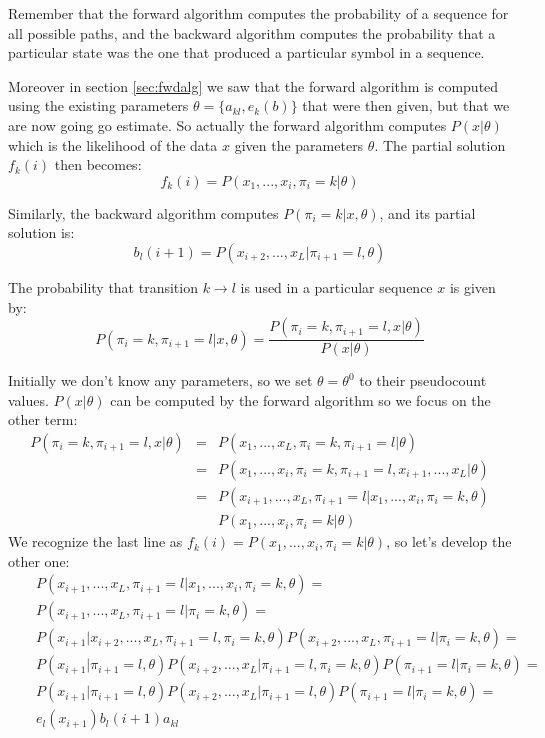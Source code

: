 Remember that the forward algorithm computes the probability of a sequence for all possible paths, and the backward algorithm computes the probability that a particular state was the one that produced a particular symbol in a sequence.

Moreover in section \ref{sec:fwdalg} we saw that the forward algorithm is computed using the existing parameters $\theta = \{ a_{kl}, e_k(b) \}$ that were then given, but that we are now going go estimate. So actually the forward algorithm computes $P(x|\theta)$ which is the likelihood of the data $x$ given the parameters $\theta$. The partial solution $f_k(i)$ then becomes:
%
\begin{equation}
f_k(i) = P(x_1,...,x_i, \pi_i = k | \theta)
\label{eq:fwdfki:bw}
\end{equation}

Similarly, the backward algorithm computes $P(\pi_i = k | x, \theta)$, and its
partial solution is:
\begin{equation}
b_l(i+1) = P(x_{i+2}, ..., x_L | \pi_{i+1}=l, \theta)
\label{eq:bkli1:bw}
\end{equation}

The probability that transition $k \rightarrow l$ is used in a particular sequence $x$ is given by:
\begin{equation}
P(\pi_i = k, \pi_{i+1} = l | x, \theta) 
=
\frac{P(\pi_i = k, \pi_{i+1} = l, x | \theta)}{P(x|\theta)}
\end{equation}

Initially we don't know any parameters, so we set $\theta = \theta^0$ to their pseudocount values.
$P(x|\theta)$ can be computed by the forward algorithm so we focus on the other term:
%
\begin{eqnarray}
P(\pi_i = k, \pi_{i+1} = l, x | \theta) & = &
P(x_1, ..., x_L, \pi_i = k, \pi_{i+1} = l | \theta) 
\\ 
& = &
P(x_1, ..., x_i, \pi_i = k, \pi_{i+1} = l, x_{i+1}, ..., x_L | \theta) 
\\
& = &
P(x_{i+1}, ..., x_L, \pi_{i+1} = l | x_1, ..., x_i, \pi_i = k, \theta)
\nonumber
\\
&&
P(x_1, ..., x_i, \pi_i = k | \theta)
\end{eqnarray}
We recognize the last line as $f_k(i)=P(x_1, ..., x_i, \pi_i = k | \theta)$, so let's develop the other one:
%
\begin{eqnarray}
&&
P(x_{i+1}, ..., x_L, \pi_{i+1} = l | x_1, ..., x_i, \pi_i = k, \theta)
=
\nonumber
\\
&&
P(x_{i+1}, ..., x_L, \pi_{i+1} = l | \pi_i = k, \theta)
=
\nonumber
\\
&&
P(x_{i+1}| x_{i+2}, ..., x_L, \pi_{i+1} = l, \pi_i = k, \theta)
P(x_{i+2}, ..., x_L, \pi_{i+1} = l | \pi_i = k, \theta)
=
\nonumber
\\
&&
P(x_{i+1}| \pi_{i+1} = l, \theta)
P(x_{i+2}, ..., x_L | \pi_{i+1} = l , \pi_i = k, \theta)
P(\pi_{i+1} = l | \pi_i = k, \theta)
=
\nonumber
\\
&&
P(x_{i+1}| \pi_{i+1} = l, \theta)
P(x_{i+2}, ..., x_L | \pi_{i+1} = l , \theta)
P(\pi_{i+1} = l | \pi_i = k, \theta)
=
\nonumber
\\
&&
e_l(x_{i+1}) b_l(i+1) a_{kl}
\end{eqnarray}

